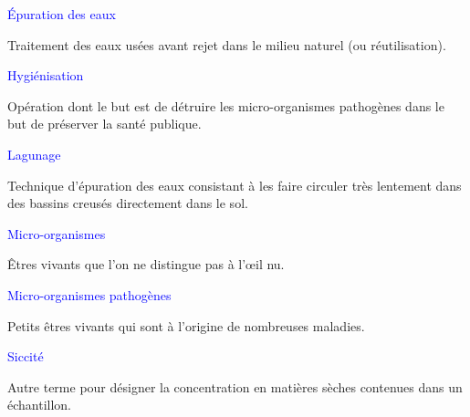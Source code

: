 \vspace{0.3cm}
\textcolor{blue}{Épuration des eaux}
\vspace{0.3cm}

Traitement des eaux usées avant rejet dans le milieu naturel (ou réutilisation).


\vspace{0.3cm}
\textcolor{blue}{Hygiénisation}
\vspace{0.3cm}

Opération dont le but est de détruire les micro-organismes pathogènes dans le but de préserver la santé publique.

\vspace{0.3cm}
\textcolor{blue}{Lagunage}
\vspace{0.3cm}

Technique d’épuration des eaux consistant à les faire circuler très lentement dans des bassins creusés directement dans le sol.

\vspace{0.3cm}
\textcolor{blue}{Micro-organismes}
\vspace{0.3cm}

Êtres vivants que l’on ne distingue pas à l’œil nu.

\vspace{0.3cm}
\textcolor{blue}{Micro-organismes pathogènes}
\vspace{0.3cm}

Petits êtres vivants qui sont à l’origine de nombreuses maladies.


\vspace{0.3cm}
\textcolor{blue}{Siccité}
\vspace{0.3cm}

Autre terme pour désigner la concentration en matières sèches contenues dans un échantillon.